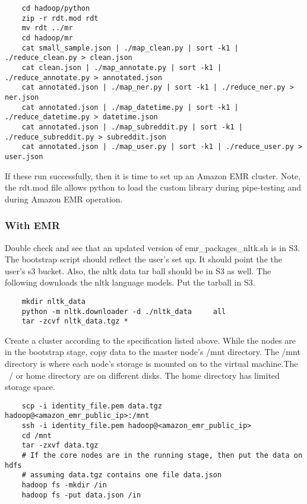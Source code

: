 \documentclass[12pt,a4paper]{article}
\begin{document}
\begin{lstlisting}
	cd hadoop/python
	zip -r rdt.mod rdt
	mv rdt ../mr
	cd hadoop/mr
	cat small_sample.json | ./map_clean.py | sort -k1 | ./reduce_clean.py > clean.json
	cat clean.json | ./map_annotate.py | sort -k1 | ./reduce_annotate.py > annotated.json
	cat annotated.json | ./map_ner.py | sort -k1 | ./reduce_ner.py > ner.json
	cat annotated.json | ./map_datetime.py | sort -k1 | ./reduce_datetime.py > datetime.json
	cat annotated.json | ./map_subreddit.py | sort -k1 | ./reduce_subreddit.py > subreddit.json
	cat annotated.json | ./map_user.py | sort -k1 | ./reduce_user.py > user.json
\end{lstlisting}

If these run successfully, then it is time to set up an Amazon EMR cluster. Note,
the rdt.mod file allows python to load the custom library during pipe-testing
and during Amazon EMR operation.

\subsubsection{With EMR}

Double check and see that an updated version of emr\_packages\_nltk.sh is in S3.
The bootstrap script should reflect the user's set up.
It should point the the user's s3 bucket. 
Also, the nltk data tar ball should be in S3 as well.
The following downloads the nltk language models.
Put the tarball in S3.

\begin{lstlisting}
	mkdir nltk_data
	python -m nltk.downloader -d ./nltk_data	 all
	tar -zcvf nltk_data.tgz *
\end{lstlisting}

Create a cluster according to the specification listed above. While the nodes
are in the bootstrap stage, copy data to the master node's /mnt directory. The
/mnt directory is where each node's storage is mounted on to the virtual
machine.The ~/ or home directory are on different disks. The home directory
has limited storage space.

\begin{lstlisting}
	scp -i identity_file.pem data.tgz hadoop@<amazon_emr_public_ip>:/mnt
	ssh -i identity_file.pem hadoop@<amazon_emr_public_ip>
	cd /mnt
	tar -zxvf data.tgz 
	# If the core nodes are in the running stage, then put the data on hdfs
	# assuming data.tgz contains one file data.json
	hadoop fs -mkdir /in
	hadoop fs -put data.json /in
\end{lstlisting}
\end{document}
